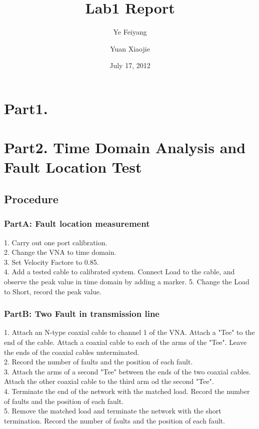 \documentclass[11pt,oneside,a4paper]{report}
\begin{document}
\title{Lab1 Report}
\author{Ye Feiyang \and Yuan Xiaojie}
\date{July 17, 2012}
\maketitle

\section*{Part1. }

\section*{Part2. Time Domain Analysis and Fault Location Test}

\subsection*{Procedure}
\subsubsection*{PartA: Fault location measurement}
1. Carry out one port calibration.\\
2. Change the VNA to time domain.\\
3. Set Velocity Factore to 0.85.\\
4. Add a tested cable to calibrated system. Connect Load to the cable, and observe the peak value in time domain by adding a marker.
5. Change the Load to Short, record the peak value.
\subsubsection*{PartB: Two Fault in transmission line}
1. Attach an N-type coaxial cable to channel 1 of the VNA. Attach a "Tee" to the end of the cable. Attach a coaxial cable to each of the arms of the "Tee". Leave the ends of the coaxial cables unterminated.\\
2. Record the number of faults and the position of each fault.\\
3. Attach the arms of a second "Tee" between the ends of the two coaxial cables. Attach the other coaxial cable to the third arm od the second "Tee".\\
4. Terminate the end of the network with the matched load. Record the number of faults and the position of each fault.\\
5. Remove the matched load and terminate the network with the short termination. Record the number of faults and the position of each fault.
\end{document}
